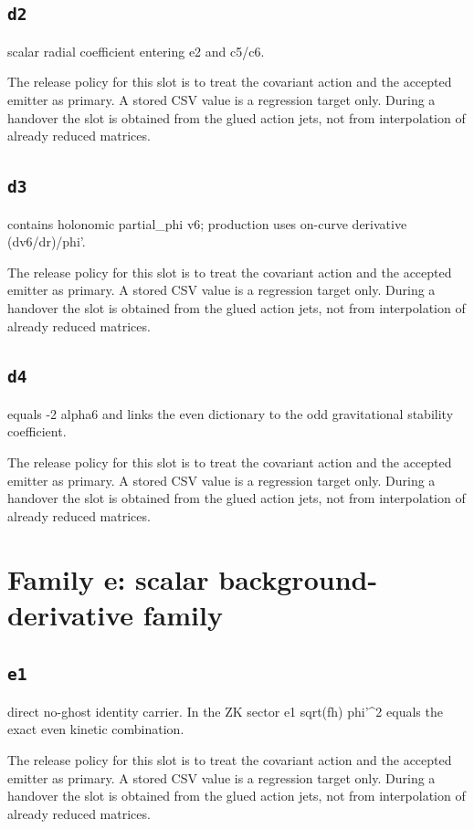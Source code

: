 \documentclass[11pt,a4paper,oneside]{book}
\begin{document}
\subsection{\texttt{d2}}
scalar radial coefficient entering e2 and c5/c6.

The release policy for this slot is to treat the covariant action and the accepted emitter as primary. A stored CSV value is a regression target only. During a handover the slot is obtained from the glued action jets, not from interpolation of already reduced matrices.\par

\subsection{\texttt{d3}}
contains holonomic partial\_phi v6; production uses on-curve derivative (dv6/dr)/phi'.

The release policy for this slot is to treat the covariant action and the accepted emitter as primary. A stored CSV value is a regression target only. During a handover the slot is obtained from the glued action jets, not from interpolation of already reduced matrices.\par

\subsection{\texttt{d4}}
equals -2 alpha6 and links the even dictionary to the odd gravitational stability coefficient.

The release policy for this slot is to treat the covariant action and the accepted emitter as primary. A stored CSV value is a regression target only. During a handover the slot is obtained from the glued action jets, not from interpolation of already reduced matrices.\par

\section{Family e: scalar background-derivative family}
\subsection{\texttt{e1}}
direct no-ghost identity carrier. In the ZK sector e1 sqrt(fh) phi'\textasciicircum{}2 equals the exact even kinetic combination.

The release policy for this slot is to treat the covariant action and the accepted emitter as primary. A stored CSV value is a regression target only. During a handover the slot is obtained from the glued action jets, not from interpolation of already reduced matrices.\par
\end{document}
